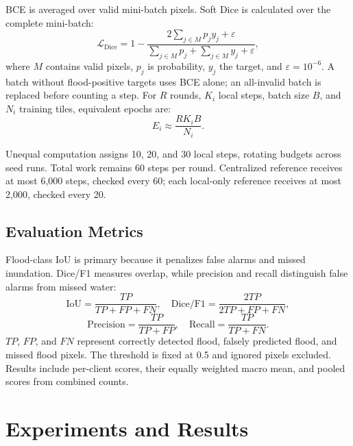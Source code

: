 \documentclass[conference]{IEEEtran}
\begin{document}
BCE is averaged over valid mini-batch pixels. Soft Dice is calculated over the complete mini-batch:
\begin{equation}
\mathcal{L}_{\text{Dice}} = 1 - \frac{2 \sum_{j \in M} p_j y_j + \varepsilon}{\sum_{j \in M} p_j + \sum_{j \in M} y_j + \varepsilon},
\label{eq:dice}
\end{equation}
where $M$ contains valid pixels, $p_j$ is probability, $y_j$ the target, and $\varepsilon = 10^{-6}$. A batch without flood-positive targets uses BCE alone; an all-invalid batch is replaced before counting a step. For $R$ rounds, $K_i$ local steps, batch size $B$, and $N_i$ training tiles, equivalent epochs are:
\begin{equation}
E_i \approx \frac{R K_i B}{N_i}.
\label{eq:epochs}
\end{equation}

Unequal computation assigns 10, 20, and 30 local steps, rotating budgets across seed runs. Total work remains 60 steps per round. Centralized reference receives at most 6,000 steps, checked every 60; each local-only reference receives at most 2,000, checked every 20.

\subsection{Evaluation Metrics}
Flood-class IoU is primary because it penalizes false alarms and missed inundation. Dice/F1 measures overlap, while precision and recall distinguish false alarms from missed water:
\begin{equation}
\text{IoU} = \frac{TP}{TP + FP + FN}, \quad \text{Dice/F1} = \frac{2 TP}{2 TP + FP + FN},
\label{eq:iou_dice}
\end{equation}
\begin{equation}
\text{Precision} = \frac{TP}{TP + FP}, \quad \text{Recall} = \frac{TP}{TP + FN}.
\label{eq:prec_rec}
\end{equation}
$TP$, $FP$, and $FN$ represent correctly detected flood, falsely predicted flood, and missed flood pixels. The threshold is fixed at 0.5 and ignored pixels excluded. Results include per-client scores, their equally weighted macro mean, and pooled scores from combined counts.

\section{Experiments and Results}
\end{document}
